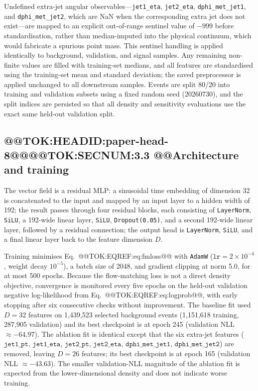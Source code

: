\documentclass[11pt]{article}
\begin{document}
Undefined extra-jet angular observables---\texttt{jet1\_eta},
\texttt{jet2\_eta}, \texttt{dphi\_met\_jet1}, and \texttt{dphi\_met\_jet2},
which are NaN when the corresponding extra jet does not exist---are mapped
to an explicit out-of-range sentinel value of $-999$ before
standardisation, rather than median-imputed into the physical continuum,
which would fabricate a spurious point mass. This sentinel handling is
applied identically to background, validation, and signal samples. Any
remaining non-finite values are filled with training-set medians, and all
features are standardised using the training-set mean and standard
deviation; the saved preprocessor is applied unchanged to all downstream
samples. Events are split 80/20 into training and validation subsets using
a fixed random seed (20260730), and the split indices are persisted so that
all density and sensitivity evaluations use the exact same held-out
validation split.

\subsection{@@TOK:HEADID:paper-head-8@@@@TOK:SECNUM:3.3 @@Architecture and training}

The vector field is a residual MLP: a sinusoidal time embedding of
dimension 32 is concatenated to the input and mapped by an input layer to a
hidden width of 192; the result passes through four residual blocks, each
consisting of \texttt{LayerNorm}, \texttt{SiLU}, a 192-wide linear layer,
\texttt{SiLU}, \texttt{Dropout(0.05)}, and a second 192-wide linear layer,
followed by a residual connection; the output head is
\texttt{LayerNorm}, \texttt{SiLU}, and a final linear layer back to the
feature dimension $D$.

Training minimises Eq.~@@TOK:EQREF:eq:fmloss@@ with \texttt{AdamW}
($\texttt{lr}=2\times10^{-4}$, weight decay $10^{-5}$), a batch size of
2048, and gradient clipping at norm 5.0, for at most 500 epochs. Because the
flow-matching loss is not a direct density objective, convergence is
monitored every five epochs on the held-out validation negative
log-likelihood from Eq.~@@TOK:EQREF:eq:logprob@@, with early stopping after six
consecutive checks without improvement. The baseline fit used
$D=32$ features on 1{,}439{,}523 selected background events (1{,}151{,}618
training, 287{,}905 validation) and its best checkpoint is at epoch 245
(validation NLL $\approx -64.97$). The ablation fit is identical except that
the six extra-jet features ($\texttt{jet1\_pt}$,
$\texttt{jet1\_eta}$, $\texttt{jet2\_pt}$, $\texttt{jet2\_eta}$,
$\texttt{dphi\_met\_jet1}$, $\texttt{dphi\_met\_jet2}$) are removed,
leaving $D=26$ features; its best checkpoint is at epoch 165 (validation NLL
$\approx -43.63$). The smaller validation-NLL magnitude of the ablation fit
is expected from the lower-dimensional density and does not indicate worse
training.
\end{document}
